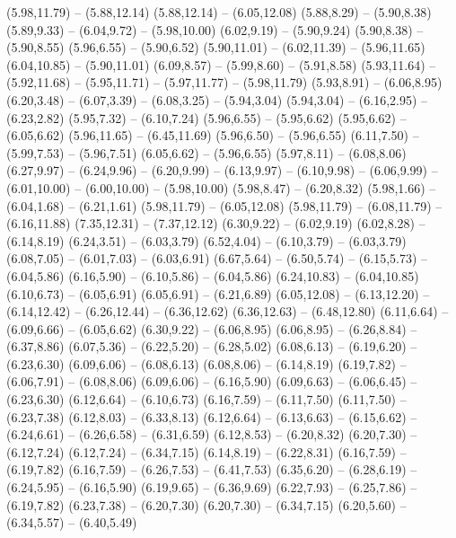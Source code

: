 {  (5.98,11.79) -- (5.88,12.14)
  (5.88,12.14) -- (6.05,12.08)
  (5.88,8.29) -- (5.90,8.38)
  (5.89,9.33) -- (6.04,9.72) -- (5.98,10.00)
  (6.02,9.19) -- (5.90,9.24)
  (5.90,8.38) -- (5.90,8.55)
  (5.96,6.55) -- (5.90,6.52)
  (5.90,11.01) -- (6.02,11.39) -- (5.96,11.65)
  (6.04,10.85) -- (5.90,11.01)
  (6.09,8.57) -- (5.99,8.60) -- (5.91,8.58)
  (5.93,11.64) -- (5.92,11.68) -- (5.95,11.71) -- (5.97,11.77) -- (5.98,11.79)
  (5.93,8.91) -- (6.06,8.95)
  (6.20,3.48) -- (6.07,3.39) -- (6.08,3.25) -- (5.94,3.04)
  (5.94,3.04) -- (6.16,2.95) -- (6.23,2.82)
  (5.95,7.32) -- (6.10,7.24)
  (5.96,6.55) -- (5.95,6.62)
  (5.95,6.62) -- (6.05,6.62)
  (5.96,11.65) -- (6.45,11.69)
  (5.96,6.50) -- (5.96,6.55)
  (6.11,7.50) -- (5.99,7.53) -- (5.96,7.51)
  (6.05,6.62) -- (5.96,6.55)
  (5.97,8.11) -- (6.08,8.06)
  (6.27,9.97) -- (6.24,9.96) -- (6.20,9.99) -- (6.13,9.97) -- (6.10,9.98) -- (6.06,9.99) -- (6.01,10.00) -- (6.00,10.00) -- (5.98,10.00)
  (5.98,8.47) -- (6.20,8.32)
  (5.98,1.66) -- (6.04,1.68) -- (6.21,1.61)
  (5.98,11.79) -- (6.05,12.08)
  (5.98,11.79) -- (6.08,11.79) -- (6.16,11.88)
  (7.35,12.31) -- (7.37,12.12)
  (6.30,9.22) -- (6.02,9.19)
  (6.02,8.28) -- (6.14,8.19)
  (6.24,3.51) -- (6.03,3.79)
  (6.52,4.04) -- (6.10,3.79) -- (6.03,3.79)
  (6.08,7.05) -- (6.01,7.03) -- (6.03,6.91)
  (6.67,5.64) -- (6.50,5.74) -- (6.15,5.73) -- (6.04,5.86)
  (6.16,5.90) -- (6.10,5.86) -- (6.04,5.86)
  (6.24,10.83) -- (6.04,10.85)
  (6.10,6.73) -- (6.05,6.91)
  (6.05,6.91) -- (6.21,6.89)
  (6.05,12.08) -- (6.13,12.20) -- (6.14,12.42) -- (6.26,12.44) -- (6.36,12.62)
  (6.36,12.63) -- (6.48,12.80)
  (6.11,6.64) -- (6.09,6.66) -- (6.05,6.62)
  (6.30,9.22) -- (6.06,8.95)
  (6.06,8.95) -- (6.26,8.84) -- (6.37,8.86)
  (6.07,5.36) -- (6.22,5.20) -- (6.28,5.02)
  (6.08,6.13) -- (6.19,6.20) -- (6.23,6.30)
  (6.09,6.06) -- (6.08,6.13)
  (6.08,8.06) -- (6.14,8.19)
  (6.19,7.82) -- (6.06,7.91) -- (6.08,8.06)
  (6.09,6.06) -- (6.16,5.90)
  (6.09,6.63) -- (6.06,6.45) -- (6.23,6.30)
  (6.12,6.64) -- (6.10,6.73)
  (6.16,7.59) -- (6.11,7.50)
  (6.11,7.50) -- (6.23,7.38)
  (6.12,8.03) -- (6.33,8.13)
  (6.12,6.64) -- (6.13,6.63) -- (6.15,6.62) -- (6.24,6.61) -- (6.26,6.58) -- (6.31,6.59)
  (6.12,8.53) -- (6.20,8.32)
  (6.20,7.30) -- (6.12,7.24)
  (6.12,7.24) -- (6.34,7.15)
  (6.14,8.19) -- (6.22,8.31)
  (6.16,7.59) -- (6.19,7.82)
  (6.16,7.59) -- (6.26,7.53) -- (6.41,7.53)
  (6.35,6.20) -- (6.28,6.19) -- (6.24,5.95) -- (6.16,5.90)
  (6.19,9.65) -- (6.36,9.69)
  (6.22,7.93) -- (6.25,7.86) -- (6.19,7.82)
  (6.23,7.38) -- (6.20,7.30)
  (6.20,7.30) -- (6.34,7.15)
  (6.20,5.60) -- (6.34,5.57) -- (6.40,5.49)
}
